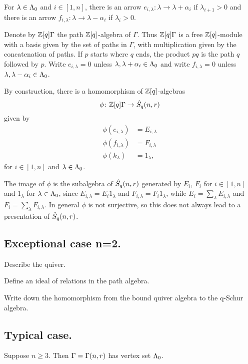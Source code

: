 \documentclass[a4paper, 11pt]{report}
\begin{document}
For $\lambda\in{\Lambda_0}$ and $i\in [1,n]$, there is an arrow $e_{i,\lambda}:\lambda\to\lambda +\alpha_i$ if $\lambda_{i+1}>0$ and there is an arrow $f_{i,\lambda}:\lambda\to\lambda -\alpha_i$ if $\lambda_i>0$.

Denote by $\mathbb{Z}[q]\Gamma$ the path $\mathbb{Z}[q]$-algebra of $\Gamma$. Thus $\mathbb{Z}[q]\Gamma$ is a free $\mathbb{Z}[q]$-module with a basis given by the set of paths in $\Gamma$, with multiplication given by the concatenation of paths. If $p$ starts where $q$ ends, the product $pq$ is the path $q$ followed by $p$. Write $e_{i,\lambda}=0$ unless $\lambda,\lambda+\alpha_i\in{\Lambda_0}$ and write $f_{i,\lambda}=0$ unless $\lambda,\lambda -\alpha_i\in{\Lambda_0}$.

By construction, there is a homomorphism of $\mathbb{Z}[q]$-algebras
\begin{equation*}
\phi\colon \mathbb{Z}[q]\Gamma\to\hat{S}_q(n,r)
\end{equation*}
given by
\begin{align*}
\phi(e_{i,\lambda}) &= E_{i,\lambda}\\
\phi(f_{i,\lambda}) &= F_{i,\lambda}\\
\phi(k_\lambda) &= 1_{\lambda},
\end{align*}
for $i\in [1,n]$ and $\lambda\in{\Lambda_0}$.

The image of $\phi$ is the subalgebra of $\hat{S}_q(n,r)$ generated by $E_i$, $F_i$ for $i\in [1,n]$ and $1_\lambda$ for $\lambda\in{\Lambda_0}$, since $E_{i,\lambda}=E_i1_\lambda$ and $F_{i,\lambda}=F_i1_\lambda$, while $E_i = \sum_\lambda E_{i,\lambda}$ and $F_i = \sum_\lambda F_{i,\lambda}$. In general $\phi$ is not surjective, so this does not always lead to a presentation of $\hat{S}_q(n,r)$.

\subsection{Exceptional case n=2.}

Describe the quiver.

Define an ideal of relations in the path algebra.

Write down the homomorphism from the bound quiver algebra to the q-Schur algebra.

\subsection{Typical case.}

Suppose $n\geq 3$. Then $\Gamma=\Gamma(n,r)$ has vertex set ${\Lambda_0}$.
\end{document}
